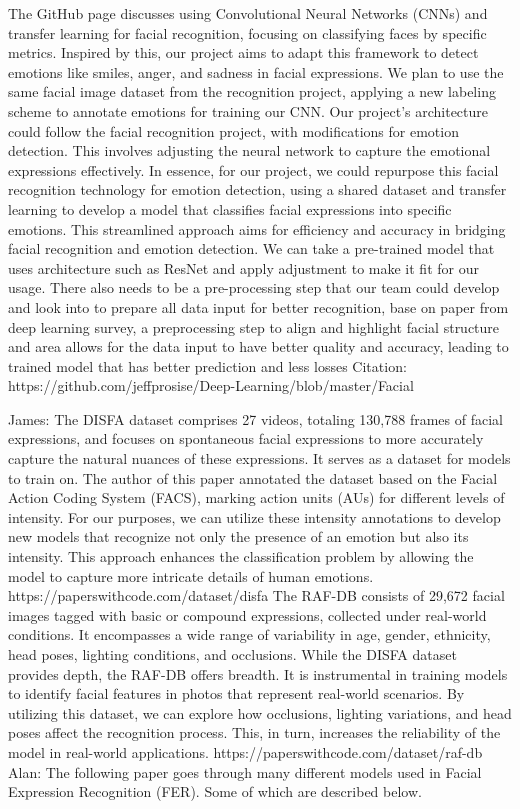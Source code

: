 \documentclass{article} %
\begin{document}
The GitHub page discusses using Convolutional Neural Networks (CNNs) and transfer learning for facial recognition, focusing on classifying faces by specific metrics. Inspired by this, our project aims to adapt this framework to detect emotions like smiles, anger, and sadness in facial expressions. We plan to use the same facial image dataset from the recognition project, applying a new labeling scheme to annotate emotions for training our CNN.  Our project's architecture could follow the facial recognition project, with modifications for emotion detection. This involves adjusting the neural network to capture the emotional expressions effectively.
In essence, for our project, we could repurpose this facial recognition technology for emotion detection, using a shared dataset and transfer learning to develop a model that classifies facial expressions into specific emotions. This streamlined approach aims for efficiency and accuracy in bridging facial recognition and emotion detection. We can take a pre-trained model that uses architecture such as ResNet and apply adjustment to make it fit for our usage. There also needs to be a pre-processing step that our team could develop and look into to prepare all data input for better recognition, base on paper from deep learning survey, a preprocessing step to align and highlight facial structure and area allows for the data input to have better quality and accuracy, leading to trained model that has better prediction and less losses
Citation:
https://github.com/jeffprosise/Deep-Learning/blob/master/Facial%

James:
The DISFA dataset comprises 27 videos, totaling 130,788 frames of facial expressions, and focuses on spontaneous facial expressions to more accurately capture the natural nuances of these expressions. It serves as a dataset for models to train on. The author of this paper annotated the dataset based on the Facial Action Coding System (FACS), marking action units (AUs) for different levels of intensity. For our purposes, we can utilize these intensity annotations to develop new models that recognize not only the presence of an emotion but also its intensity. This approach enhances the classification problem by allowing the model to capture more intricate details of human emotions.
https://paperswithcode.com/dataset/disfa 
The RAF-DB consists of 29,672 facial images tagged with basic or compound expressions, collected under real-world conditions. It encompasses a wide range of variability in age, gender, ethnicity, head poses, lighting conditions, and occlusions. While the DISFA dataset provides depth, the RAF-DB offers breadth. It is instrumental in training models to identify facial features in photos that represent real-world scenarios. By utilizing this dataset, we can explore how occlusions, lighting variations, and head poses affect the recognition process. This, in turn, increases the reliability of the model in real-world applications.
https://paperswithcode.com/dataset/raf-db 
Alan:
The following paper goes through many different models used in Facial Expression Recognition (FER). Some of which are described below.
\end{document}
